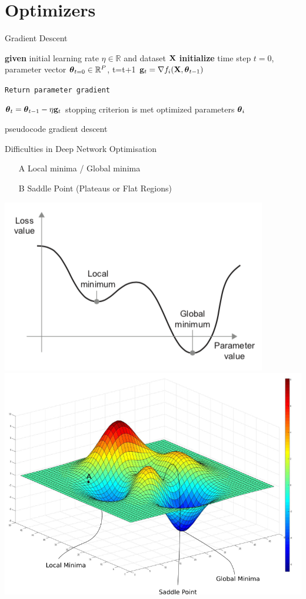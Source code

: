 \documentclass[xcolor=pdftex,dvipsnames,table,mathserif]{beamer}
\begin{document}
\section{Optimizers}

\begin{frame}{Gradient Descent \cite{Cauchy47}}
\begin{algorithm}[H]
\begin{algorithmic}[1]
\STATE \textbf{given} initial learning rate $\eta \in \mathbb{R}$ and dataset $\mathbf{X}$
\STATE \textbf{initialize} time step $t=0$, parameter vector $\boldsymbol{\theta}_{t=0} \in \mathbb{R}^P$,
\REPEAT
\STATE t=t+1
\STATE $\mathbf{g}_t = \nabla f_i(\mathbf{X},\boldsymbol{\theta}_{t-1})$  \begin{tiny}\texttt{Return parameter gradient}\end{tiny}
\STATE $\boldsymbol{\theta}_t=\boldsymbol{\theta}_{t-1}  - \eta \mathbf{g}_t$
\UNTIL stopping criterion is met
\RETURN optimized parameters $\boldsymbol{\theta}_i$
\end{algorithmic}
\caption{pseudocode gradient descent }
\label{alg:seq}
\end{algorithm}
\end{frame}

\begin{frame}{Difficulties in Deep Network Optimisation}
\begin{itemize}
\item[A]{Local minima / Global minima}
\item[B]{Saddle Point (Plateaus or Flat Regions)}
\end{itemize}
\includegraphics[width=.45\columnwidth]{../graphics/LocalGlobalMinimum}
\includegraphics[width=.45\columnwidth]{../graphics/challenges1} \\
\end{frame}
\end{document}
